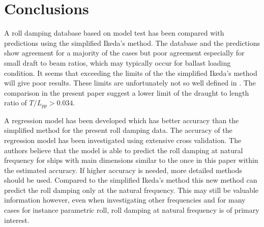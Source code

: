 \section{Conclusions}
\label{se:conclusions}
A roll damping database based on model test has been compared with predictions using  the simplified Ikeda's method. The database and the predictions show agreement for a majority of the cases but poor agreement especially for small draft to beam ratios, which may typically occur for ballast loading condition. It seems that exceeding the limits of the the simplified Ikeda's method will give poor results. These limits are unfortunately not so well defined in \parencite{kawahara_simple_2011}. The comparison in the present paper suggest a lower limit of the draught to length ratio of $T/L_{pp}>0.034$.

A regression model has been developed which has better accuracy than the simplified method for the present roll damping data. The accuracy of the regression model has been investigated using extensive cross validation. The authors believe that the model is able to predict the roll damping at natural frequency for ships with main dimensions similar to the once in this paper within the estimated accuracy. If higher accuracy is needed, more detailed methods should be used. Compared to the simplified Ikeda's method this new method can predict the roll damping only at the natural frequency. This may still be valuable information however, even when investigating other frequencies and for many cases for instance parametric roll, roll damping at natural frequency is of primary interest.

